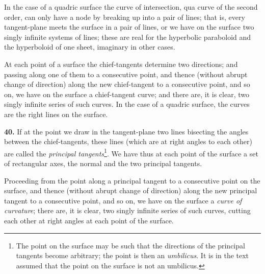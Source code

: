 \documentclass[11pt,a4paper]{article}
\theoremstyle{definition}
\begin{document}
In the case of a quadric surface the curve of intersection, qua curve of the second order, can only have a node by breaking up into a pair of lines; that is, every tangent-plane meets the surface in a pair of lines, or we have on the surface two singly infinite systems of lines; these are real for the hyperbolic paraboloid and the hyperboloid of one sheet, imaginary in other cases.

At each point of a surface the chief-tangents determine two directions; and passing along one of them to a consecutive point, and thence (without abrupt change of direction) along the new chief-tangent to a consecutive point, and so on, we have on the surface a chief-tangent curve; and there are, it is clear, two singly infinite series of such curves. In the case of a quadric surface, the curves are the right lines on the surface.

\textbf{40.} If at the point we draw in the tangent-plane two lines bisecting the angles between the chief-tangents, these lines (which are at right angles to each other) are called the \textit{principal tangents}\footnote{The point on the surface may be such that the directions of the principal tangents become arbitrary; the point is then an \textit{umbilicus}. It is in the text assumed that the point on the surface is not an umbilicus.}. We have thus at each point of the surface a set of rectangular axes, the normal and the two principal tangents.

Proceeding from the point along a principal tangent to a consecutive point on the surface, and thence (without abrupt change of direction) along the new principal tangent to a consecutive point, and so on, we have on the surface a \textit{curve of curvature}; there are, it is clear, two singly infinite series of such curves, cutting each other at right angles at each point of the surface.
\end{document}
